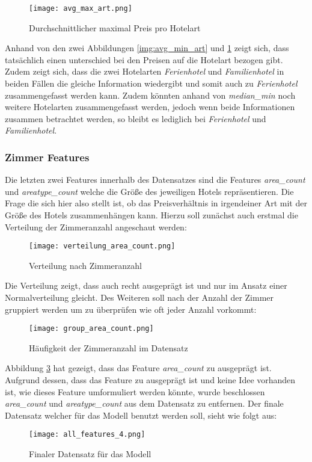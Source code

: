 \begin{figure}[h]
    \centering
    \texttt{[image: avg\_max\_art.png]}
    \caption[Durchschnittlicher maximal Preis pro Hotelart]{Durchschnittlicher maximal Preis pro Hotelart}
    \label{img:avg_max_art}
\end{figure}

Anhand von den zwei Abbildungen \ref{img:avg_min_art} und \ref{img:avg_max_art} zeigt sich, dass tatsächlich einen unterschied bei den Preisen auf die Hotelart bezogen gibt. Zudem zeigt sich, dass die zwei Hotelarten \emph{Ferienhotel} und \emph{Familienhotel} in beiden Fällen die gleiche Information wiedergibt und somit auch zu \emph{Ferienhotel} zusammengefasst werden kann. Zudem könnten anhand von \emph{median\_min} noch weitere Hotelarten zusammengefasst werden, jedoch wenn beide Informationen zusammen betrachtet werden, so bleibt es lediglich bei \emph{Ferienhotel} und \emph{Familienhotel}.

\subsubsection{Zimmer Features}
Die letzten zwei Features innerhalb des Datensatzes sind die Features \emph{area\_count} und \emph{areatype\_count} welche die Größe des jeweiligen Hotels repräsentieren. Die Frage die sich hier also stellt ist, ob das Preisverhältnis in irgendeiner Art mit der Größe des Hotels zusammenhängen kann. Hierzu soll zunächst auch erstmal die Verteilung der Zimmeranzahl angeschaut werden:

\begin{figure}[h]
    \centering
    \texttt{[image: verteilung\_area\_count.png]}
    \caption[Verteilung nach Zimmeranzahl]{Verteilung nach Zimmeranzahl}
    \label{img:verteilung_area_count}
\end{figure}

Die Verteilung zeigt, dass auch recht ausgeprägt ist und nur im Ansatz einer Normalverteilung gleicht. Des Weiteren soll nach der Anzahl der Zimmer gruppiert werden um zu überprüfen wie oft jeder Anzahl vorkommt:

\begin{figure}[h]
    \centering
    \texttt{[image: group\_area\_count.png]}
    \caption[Häufigkeit der Zimmeranzahl im Datensatz]{Häufigkeit der Zimmeranzahl im Datensatz}
    \label{img:haufigkeit_area_count}
\end{figure}
Abbildung \ref{img:haufigkeit_area_count} hat gezeigt, dass das Feature \emph{area\_count} zu ausgeprägt ist. Aufgrund dessen, dass das Feature zu ausgeprägt ist und keine Idee vorhanden ist, wie dieses Feature umformuliert werden könnte, wurde beschlossen \emph{area\_count} und \emph{areatype\_count} aus dem Datensatz zu entfernen.
\newline
\newline
Der finale Datensatz welcher für das Modell benutzt werden soll, sieht wie folgt aus:

\begin{figure}[h]
    \centering
    \texttt{[image: all\_features\_4.png]}
    \caption[Finaler Datensatz für das Modell]{Finaler Datensatz für das Modell}
    \label{img:all_features_4}
\end{figure}